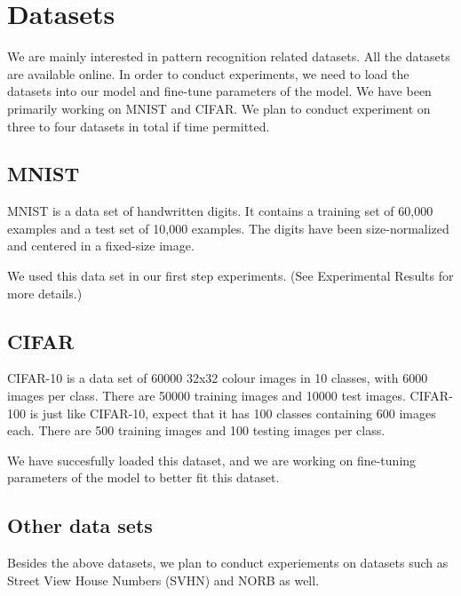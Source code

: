 \section{Datasets}
\label{sec:meth}


We are mainly interested in pattern recognition related datasets.
All the datasets are available online.
In order to conduct experiments, we need to load the datasets into our
model and fine-tune parameters of the model.
We have been primarily working on MNIST and CIFAR. We plan to
conduct experiment on three to four datasets in total if time permitted.

\subsection{MNIST}
MNIST is a data set of handwritten digits. It contains a training set of
60,000 examples and a test set of 10,000 examples. The digits have been
size-normalized and centered in a fixed-size image.

We used this data set in our first step experiments. (See Experimental
Results for more details.)

\subsection{CIFAR}
CIFAR-10 is a data set of 60000 32x32 colour images in 10 classes, with 6000 images per class. There are 50000 training images and 10000 test
images.
CIFAR-100 is just like CIFAR-10, expect that it has 100 classes containing
600 images each. There are 500 training images and 100 testing images per
class.

We have succesfully loaded this dataset, and we are working on
fine-tuning parameters of the model to better fit this dataset.

\subsection{Other data sets}
Besides the above datasets, we plan to conduct experiements on
datasets such as Street View House Numbers (SVHN) and NORB as well.

